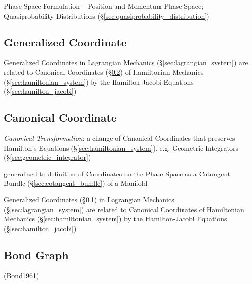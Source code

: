 Phase Space Formulation -- Position and Momentum Phase Space; Quasiprobability
Distributions (\S\ref{sec:quasiprobability_distribution})



\subsection{Generalized Coordinate}\label{sec:generalized_coordinate}

Generalized Coordinates in Lagrangian Mechanics (\S\ref{sec:lagrangian_system})
are related to Canonical Coordinates (\S\ref{sec:canonical_coordinate}) of
Hamiltonian Mechanics (\S\ref{sec:hamiltonian_system}) by the Hamilton-Jacobi
Equations (\S\ref{sec:hamilton_jacobi})



\subsection{Canonical Coordinate}\label{sec:canonical_coordinate}

\emph{Canonical Transformation}: a change of Canonical Coordinates that
preserves Hamilton's Equations (\S\ref{sec:hamiltonian_system}), e.g. Geometric
Integrators (\S\ref{sec:geometric_integrator})

generalized to definition of Coordinates on the Phase Space as a Cotangent
Bundle (\S\ref{sec:cotangent_bundle}) of a Manifold

Generalized Coordinates (\S\ref{sec:generalized_coordinate}) in Lagrangian
Mechanics (\S\ref{sec:lagrangian_system}) are related to Canonical Coordinates
of Hamiltonian Mechanics (\S\ref{sec:hamiltonian_system}) by the
Hamilton-Jacobi Equations (\S\ref{sec:hamilton_jacobi})



\subsection{Bond Graph}\label{sec:bond_graph}

(Bond1961)

